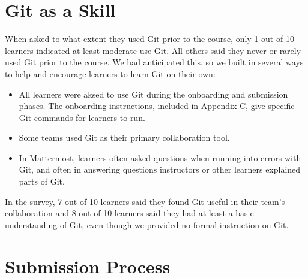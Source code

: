\documentclass[12pt,twoside]{mitthesis}
\newcommand{\review}[1]{{#1}}
\begin{document}
\section{Git as a Skill}

\review{When asked to what extent they used Git prior to the course, only 1 out of 10 learners indicated at least moderate use Git. All others said they never or rarely used Git prior to the course. We had anticipated this, so we built in several ways to help and encourage learners to learn Git on their own:
\begin{itemize}
\item All learners were aksed to use Git during the onboarding and submission phases. The onboarding instructions, included in Appendix C, give specific Git commands for learners to run.
\item Some teams used Git as their primary collaboration tool.
\item In Mattermost, learners often asked questions when running into errors with Git, and often in answering questions instructors or other learners explained parts of Git.
\end{itemize}
In the survey, 7 out of 10 learners said they found Git useful in their team's collaboration and 8 out of 10 learners said they had at least a basic understanding of Git, even though we provided no formal instruction on Git.}

\section{Submission Process}
\end{document}
